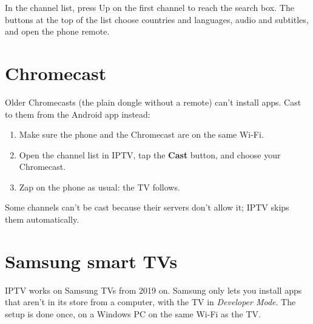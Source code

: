 In the channel list, press Up on the first channel to reach the search box.
The buttons at the top of the list choose countries and languages, audio and
subtitles, and open the phone remote.


\section{Chromecast}
\label{sec:chromecast}

Older Chromecasts (the plain dongle without a remote) can't install apps.
Cast to them from the Android app instead:
\begin{enumerate}
  \item Make sure the phone and the Chromecast are on the same Wi-Fi.
  \item Open the channel list in IPTV, tap the \textbf{Cast} button, and
        choose your Chromecast.
  \item Zap on the phone as usual: the TV follows.
\end{enumerate}
Some channels can't be cast because their servers don't allow it; IPTV skips
them automatically.

\section{Samsung smart TVs}

IPTV works on Samsung TVs from 2019 on. Samsung only lets you install apps
that aren't in its store from a computer, with the TV in \emph{Developer
Mode}. The setup is done once, on a Windows PC on the same Wi-Fi as the TV.

